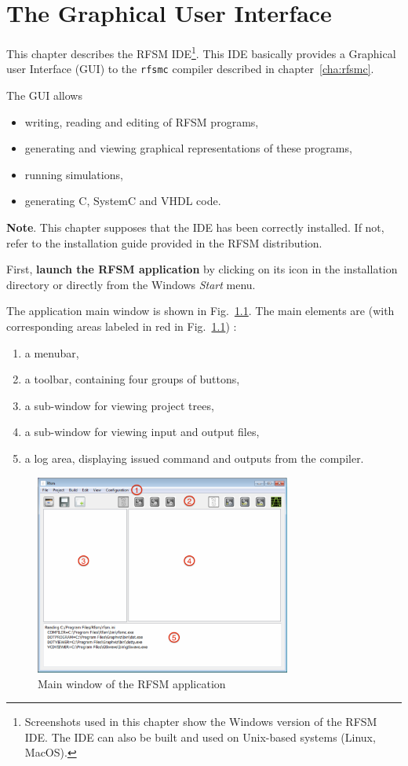 \chapter{The Graphical User Interface}
\label{cha:gui}

This chapter describes the RFSM IDE\footnote{Screenshots used in this chapter show the Windows
  version of the RFSM IDE. The IDE can also be built and used on Unix-based systems (Linux,
  MacOS).}. This IDE basically provides a Graphical user Interface (GUI) to the \verb|rfsmc|
compiler described in chapter~\ref{cha:rfsmc}.

\medskip
The GUI allows
\begin{itemize}
\item writing, reading and editing of RFSM programs,
\item generating and viewing graphical representations of these programs,
\item running simulations,
\item generating C, SystemC and VHDL code.
\end{itemize}

\medskip
\textbf{Note}. This chapter supposes that the IDE has been correctly installed. If not, refer to the
installation guide provided in the RFSM distribution.

\medskip
First, \textbf{launch the RFSM application} by clicking on its icon in the installation directory or
directly from the Windows \emph{Start} menu. 

\medskip
The application main window is shown in Fig.~\ref{fig:main-window}. 
The main elements are (with corresponding areas labeled in red in Fig.~\ref{fig:main-window}) :
\begin{enumerate}
\item a menubar,
\item a toolbar, containing four groups of buttons,
\item a sub-window for viewing project trees,
\item a sub-window for viewing input and output files,
\item a log area, displaying issued command and outputs from the compiler.
\end{enumerate}

\begin{figure}[h]
  \centering
  \includegraphics[width=0.75\textwidth]{figs/gui/mainwindow}
  \caption{Main window of the RFSM application}
  \label{fig:main-window}
\end{figure}

